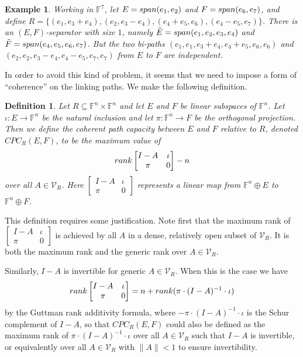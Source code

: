 \documentclass[10pt,a4paper]{amsart}
\newtheorem{defn}[thm]{Definition}
\newtheorem{exmp}[thm]{Example}
\begin{document}
\begin{exmp}
Working in $\mathbb{F}^7$, let $E = {\rm span}(e_1, e_2)$ and $F = {\rm span}(e_6, e_7)$, and define $R = \{(e_1, e_3 + e_4), (e_2, e_3 - e_4), (e_4 + e_5, e_6), (e_4 - e_5, e_7)\}$. There is an $(E,F)$-separator with size $1$, namely $\tilde{E} = {\rm span}(e_1, e_2, e_3, e_4)$ and $\tilde{F} = {\rm span}(e_4, e_5, e_6, e_7)$. But the two bi-paths $(e_1, e_1, e_3 + e_4, e_4 + e_5, e_6, e_6)$ and $(e_2, e_2, e_3 - e_4, e_4 - e_5, e_7, e_7)$ from $E$ to $F$ are independent.
\end{exmp}

In order to avoid this kind of problem, it seems that we need to impose a form of ``coherence'' on the linking paths. We make the following definition.

\begin{defn}
Let $R \subseteq \mathbb{F}^n \times \mathbb{F}^n$ and let $E$ and $F$ be linear subspaces of $\mathbb{F}^n$. Let $\iota: E \to \mathbb{F}^n$ be the natural inclusion and let $\pi: \mathbb{F}^n \to F$ be the orthogonal projection. Then we define the {\it coherent path capacity between $E$ and $F$ relative to $R$}, denoted $CPC_R(E,F)$, to be the maximum value of $${\rm rank}\left[\begin{matrix}I - A& \iota\\ \pi&0\end{matrix}\right] - n$$ over all $A \in \mathcal{V}_R$. Here $\left[\begin{matrix}I - A& \iota\\ \pi&0\end{matrix}\right]$ represents a linear map from $\mathbb{F}^n \oplus E$ to $\mathbb{F}^n \oplus F$.
\end{defn}

This definition requires some justification. Note first that the maximum rank of $\left[\begin{matrix}I - A& \iota\\ \pi&0\end{matrix}\right]$ is achieved by all $A$ in a dense, relatively open subset of $\mathcal{V}_R$. It is both the maximum rank and the generic rank over $A \in \mathcal{V}_R$.

Similarly, $I - A$ is invertible for generic $A \in \mathcal{V}_R$. When this is the case we have $${\rm rank}\left[\begin{matrix}I - A& \iota\\ \pi&0\end{matrix}\right] = n + {\rm rank}(\pi\cdot(I - A)^{-1}\cdot \iota)$$ by the Guttman rank additivity formula, where $-\pi\cdot(I - A)^{-1}\cdot \iota$ is the Schur complement of $I - A$, so that $CPC_R(E, F)$ could also be defined as the maximum rank of $\pi\cdot (I - A)^{-1}\cdot \iota$ over all $A \in \mathcal{V}_R$ such that $I - A$ is invertible, or equivalently over all $A \in \mathcal{V}_R$ with $\|A\| < 1$ to ensure invertibility.
\end{document}
